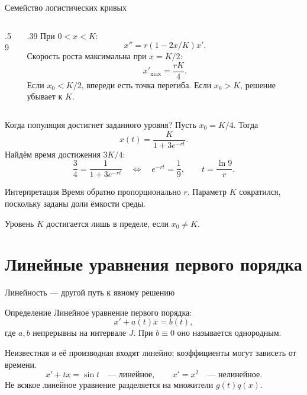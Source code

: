 \documentclass[aspectratio=169,11pt]{beamer}
\begin{document}
\begin{frame}{Семейство логистических кривых}
\begin{columns}[c]
\begin{column}{.59\textwidth}
\centering
{}
\end{column}
\begin{column}{.39\textwidth}
При $0<x<K$:
\[
x''=r(1-2x/K)x'.
\]
Скорость роста максимальна при $x=K/2$:
\[
x'_{\max}=\frac{rK}{4}.
\]
Если $x_0<K/2$, впереди есть точка перегиба.
Если $x_0>K$, решение убывает к $K$.
\end{column}
\end{columns}
\end{frame}

\begin{frame}{Когда популяция достигнет заданного уровня?}
Пусть $x_0=K/4$. Тогда
\[
x(t)=\frac{K}{1+3e^{-rt}}.
\]
Найдём время достижения $3K/4$:
\[
\frac34=\frac{1}{1+3e^{-rt}}
\quad\Longleftrightarrow\quad e^{-rt}=\frac19,
\qquad \boxed{t=\frac{\ln9}{r}}.
\]
\begin{block}{Интерпретация}
Время обратно пропорционально $r$.
Параметр $K$ сократился, поскольку заданы доли ёмкости среды.
\end{block}
Уровень $K$ достигается лишь в пределе, если $x_0\ne K$.
\end{frame}

\section{Линейные уравнения первого порядка}
\begin{frame}{Линейность --- другой путь к явному решению}
\begin{block}{Определение}
Линейное уравнение первого порядка:
\[
\boxed{x'+a(t)x=b(t)},
\]
где $a,b$ непрерывны на интервале $J$.
При $b\equiv0$ оно называется однородным.
\end{block}
Неизвестная и её производная входят линейно;
коэффициенты могут зависеть от времени.
\[
x'+tx=\sin t\quad\text{--- линейное},\qquad
x'=x^2\quad\text{--- нелинейное}.
\]
Не всякое линейное уравнение разделяется на множители $g(t)q(x)$.
\end{frame}
\end{document}

